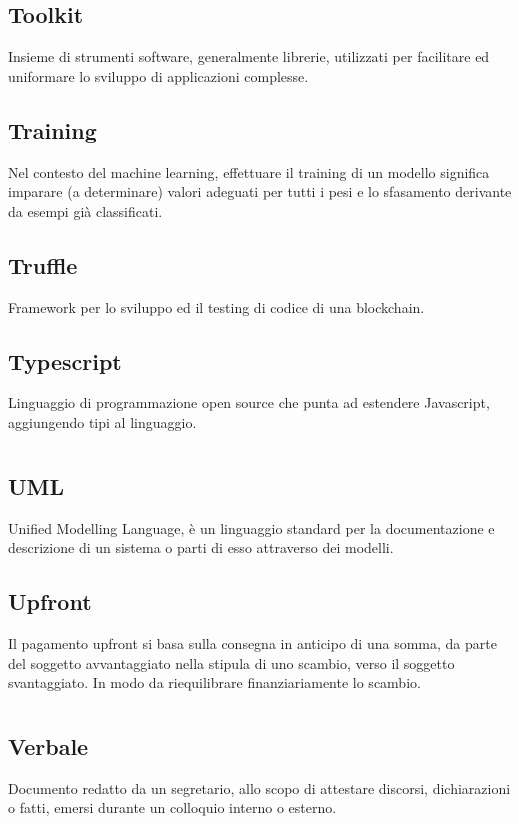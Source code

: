 	\subsection*{Toolkit}
	Insieme di strumenti software, generalmente librerie, utilizzati per facilitare ed uniformare lo sviluppo di applicazioni complesse.
	\subsection*{Training}
	Nel contesto del machine learning, effettuare il training di un modello significa imparare (a determinare) valori adeguati per tutti i pesi e lo sfasamento derivante da esempi già classificati.
	\subsection*{Truffle}
	Framework per lo sviluppo ed il testing di codice di una blockchain. 
	\subsection*{Typescript}
	Linguaggio di programmazione open source che punta ad estendere Javascript, aggiungendo tipi al linguaggio.
\pagebreak
\section[U]{}
	\subsection*{UML}
	Unified Modelling Language, è un linguaggio  standard per la documentazione e descrizione di un sistema o parti di esso attraverso dei modelli.
	\subsection*{Upfront}
	Il pagamento upfront si basa sulla consegna in anticipo di una somma, da parte del soggetto avvantaggiato nella stipula di uno scambio, verso il soggetto svantaggiato. In modo da riequilibrare finanziariamente lo scambio.
\pagebreak
\section[V]{}
	\subsection*{Verbale}
	Documento redatto da un segretario, allo scopo di attestare discorsi, dichiarazioni o fatti, emersi durante un colloquio interno o esterno.
